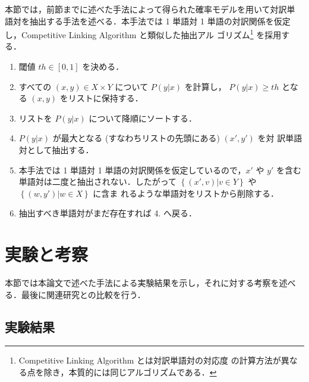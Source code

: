 本節では，前節までに述べた手法によって得られた確率モデルを用いて対訳単
語対を抽出する手法を述べる．本手法では 1 単語対 1 単語の対訳関係を仮定
し，Competitive Linking Algorithm \cite{melamed_97} と類似した抽出アル
ゴリズム\footnote{Competitive Linking Algorithm とは対訳単語対の対応度
  の計算方法が異なる点を除き，本質的には同じアルゴリズムである．}
を採用する．
  \begin{enumerate}
  \item[1.]
    閾値 $th \in [0,1]$ を決める．
  \item[2.]
    すべての $(x,y) \in X \times Y$ について $P(y|x)$ を計算し，
    $P(y|x) \geq th$ となる $(x,y)$ をリストに保持する．
  \item[3.]
    リストを $P(y|x)$ について降順にソートする．
  \item[4.]\label{enum:rep}
    $P(y|x)$ が最大となる (すなわちリストの先頭にある) $(x',y')$ を対
    訳単語対として抽出する．
  \item[5.]
    本手法では 1 単語対 1 単語の対訳関係を仮定しているので，$x'$ や
    $y'$ を含む単語対は二度と抽出されない．したがって $\left\{(x',v) |
      v \in Y \right\}$ や $\left\{(w,y') |  w \in X \right\}$ に含ま
    れるような単語対をリストから削除する．
  \item[6.]
    抽出すべき単語対がまだ存在すれば 4. へ戻る．
  \end{enumerate}


\section{実験と考察}
\label{sec:experiment_discussion}
本節では本論文で述べた手法による実験結果を示し，それに対する考察を述べ
る．最後に関連研究との比較を行う．
\subsection{実験結果}
\label{sec:result}


